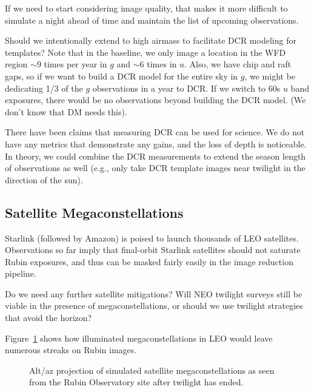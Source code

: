 If we need to start considering image quality, that makes it more difficult to simulate a night ahead of time and maintain the list of upcoming observations.

Should we intentionally extend to high airmass to facilitate DCR modeling for templates? Note that in the baseline, we only image a location in the WFD region $\sim$9 times per year in $g$ and $\sim$6 times in $u$. Also, we have chip and raft gaps, so if we want to build a DCR model for the entire sky in $g$, we might be dedicating 1/3 of the $g$ observations in a year to DCR. If we switch to 60s $u$ band exposures, there would be no observations beyond building the DCR model. (We don't know that DM needs this).

There have been claims that measuring DCR can be used for science.  We do not have any metrics that demonstrate any gains, and the loss of depth is noticeable. In theory, we could combine the DCR measurements to extend the season length of observations as well (e.g., only take DCR template images near twilight in the direction of the sun).


\subsection{Satellite Megaconstellations}

Starlink (followed by Amazon) is poised to launch thousands of LEO satellites. Observations so far imply that final-orbit Starlink satellites should not saturate Rubin exposures, and thus can be masked fairly easily in the image reduction pipeline. 

Do we need any further satellite mitigations? Will NEO twilight surveys still be viable in the presence of megaconstellations, or should we use twilight strategies that avoid the horizon?

Figure~\ref{fig:megasat} shows how illuminated megaconstellations in LEO would leave numerous streaks on Rubin images.

\begin{figure}
\label{fig:megasat}
\caption{Alt/az projection of simulated satellite megaconstellations as seen from the Rubin Observatory site after twilight has ended. } 
\end{figure}


